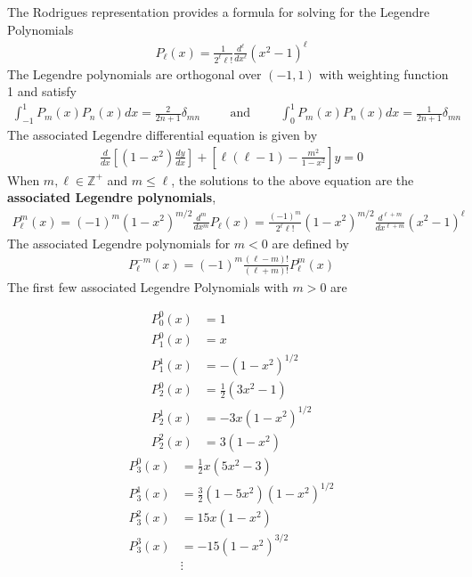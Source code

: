 The Rodrigues representation provides a formula for solving for the Legendre Polynomials
\begin{align}
	P_\ell(x) = \frac{1}{2^\ell \ell!}\frac{d^\ell}{dx^\ell}(x^2-1)^\ell
\end{align}
The Legendre polynomials are orthogonal over $(-1,1)$ with weighting function 1 and satisfy
\begin{align}
	\int_{-1}^{1}P_m(x)P_n(x)dx = \frac{2}{2n+1}\delta_{mn} \hspace{1cm} \textrm{and}\hspace{1cm}	\int_{0}^{1}P_m(x)P_n(x)dx = \frac{1}{2n+1}\delta_{mn}
\end{align} 
The associated Legendre differential equation is given by
\begin{align}
	\frac{d}{dx}\left[(1-x^2)\frac{dy}{dx}\right]
	+\left[\ell(\ell-1)-\frac{m^2}{1-x^2}\right]y=0
\end{align}
When $m,\ell \in \mathbb{Z}^+$ and $m \leq \ell$, the solutions to the above  equation are the \textbf{associated Legendre polynomials},
\begin{align}
	P_\ell^m(x) = (-1)^m(1-x^2)^{m/2}\frac{d^m}{dx^m}P_\ell(x) = \frac{(-1)^m}{2^\ell \ell!}(1-x^2)^{m/2}	\frac{d^{\ell+m}}{dx^{\ell+m}}(x^2-1)^\ell
\end{align}
The associated Legendre polynomials for $m < 0$ are defined by
\begin{align}
	P_\ell^{-m}(x) = (-1)^m \frac{(\ell - m)!}{(\ell+m)!}P_\ell^m(x)
\end{align}
The first few associated Legendre Polynomials with $m>0$ are
\begin{multicols}{2}
	\noindent
	\begin{align}
		P_0^0(x) &= 1 \\
		P_1^0(x) &= x \\
		P_1^1(x) &= -(1-x^2)^{1/2} \\
		P_2^0(x) &=\frac{1}{2}(3x^2-1) \\
		P_2^1(x) &= -3x(1-x^2)^{1/2} \\
		P_2^2(x) &= 3(1-x^2)
	\end{align}
	\begin{align}
		P_3^0(x) &= \frac{1}{2}x(5x^2-3) \\
		P_3^1(x) &= \frac{3}{2}(1-5x^2)(1-x^2)^{1/2} \\
		P_3^2(x) &= 15x(1-x^2) \\
		P_3^3(x) &= -15(1-x^2)^{3/2} \\
		&\vdots \nonumber
	\end{align}
\end{multicols}
